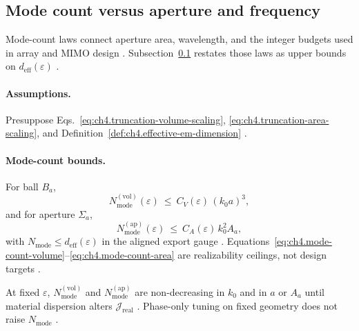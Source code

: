 ﻿\subsection{Mode count versus aperture and frequency}
\label{sec:ch481}

Mode-count laws connect aperture area, wavelength, and the integer budgets used in array and MIMO design \cite{collin2001,jackson1999,hansen1988}.
Subsection~\ref{sec:ch481} restates those laws as upper bounds on \(d_{\mathrm{eff}}(\varepsilon)\) \cite{stratton1941,harrington2001,devaney2004}.

\paragraph{Assumptions.}
Presuppose Eqs.~\eqref{eq:ch4.truncation-volume-scaling}, \eqref{eq:ch4.truncation-area-scaling}, and Definition~\ref{def:ch4.effective-em-dimension}
\cite{stratton1941,hansen1988,harrington2001}.

\paragraph{Mode-count bounds.}
For ball \(B_{a}\),
\begin{equation}
\label{eq:ch4.mode-count-volume}
N_{\mathrm{mode}}^{\mathrm{(vol)}}(\varepsilon)
\ \le\
C_{V}(\varepsilon)\,(k_{0}a)^{3},
\end{equation}
and for aperture \(\Sigma_{a}\),
\begin{equation}
\label{eq:ch4.mode-count-area}
N_{\mathrm{mode}}^{\mathrm{(ap)}}(\varepsilon)
\ \le\
C_{A}(\varepsilon)\,k_{0}^{2}A_{a},
\end{equation}
with \(N_{\mathrm{mode}}\le d_{\mathrm{eff}}(\varepsilon)\) in the aligned export gauge \cite{collin2001,jackson1999,hansen1988,harrington2001}.
Equations~\eqref{eq:ch4.mode-count-volume}--\eqref{eq:ch4.mode-count-area} are realizability ceilings, not design targets
\cite{stratton1941,devaney2004}.

\begin{theorem}
\label{thm:ch4.mode-count-monotone}
At fixed \(\varepsilon\), \(N_{\mathrm{mode}}^{\mathrm{(vol)}}\) and \(N_{\mathrm{mode}}^{\mathrm{(ap)}}\) are non-decreasing in
\(k_{0}\) and in \(a\) or \(A_{a}\) until material dispersion alters \(\mathcal{J}_{\mathrm{real}}\) \cite{stratton1941,jackson1999,hansen1988}.
Phase-only tuning on fixed geometry does not raise \(N_{\mathrm{mode}}\) \cite{devaney2004,harrington2001}.
\end{theorem}

